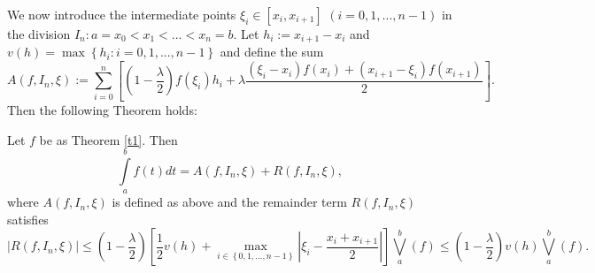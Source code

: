 \documentclass[
11pt,%
tightenlines,%
twoside,%
onecolumn,%
nofloats,%
nobibnotes,%
nofootinbib,%
superscriptaddress,%
noshowpacs,%
centertags]%
{revtex4}
\begin{document}
We now introduce the intermediate points $\xi _{i}\in \left[ x_{i},x_{i+1}%
\right] $ $\left( i=0,1,...,n-1\right) $ in the division $%
I_{n}:a=x_{0}<x_{1}<...<x_{n}=b$. Let $h_{i}:=x_{i+1}-x_{i}$ and $v(h)=\max
\left\{ h_{i}:i=0,1,...,n-1\right\} $ and define the sum%
\begin{equation}\label{h1}
A(f,I_{n},\xi ) :=\sum\limits_{i=0}^{n}\left[ \left( 1-\frac{\lambda }{2}%
\right) f(\xi _{i})h_{i}+\lambda \frac{\left( \xi _{i}-x_{i}\right)
f(x_{i})+\left( x_{i+1}-\xi _{i}\right) f(x_{i+1})}{2}\right].
\end{equation}%
Then the following Theorem holds:

\begin{theorem}
\label{t2} Let $f$ be as Theorem \ref{t1}. Then
\begin{equation}
\int\limits_{a}^{b}f(t)dt=A(f,I_{n},\xi )+R(f,I_{n},\xi ),
\label{h2}
\end{equation}%
where $A(f,I_{n},\xi )$ is defined as above and the remainder term $%
R(f,I_{n},\xi )$ satisfies%
$$
\left\vert R(f,I_{n},\xi )\right\vert \label{5}\leq \left( 1-\frac{\lambda }{2}%
\right) \left[ \frac{1}{2}v(h)+\max_{i\in \left\{
0,1,...,n-1\right\} }\left\vert \xi
_{i}-\frac{x_{i}+x_{i+1}}{2}\right\vert \right]
\bigvee\limits_{a}^{b}(f) \leq \left( 1-\frac{\lambda }{2}\right)
v(h)\bigvee\limits_{a}^{b}(f). $$
\end{theorem}
\end{document}

